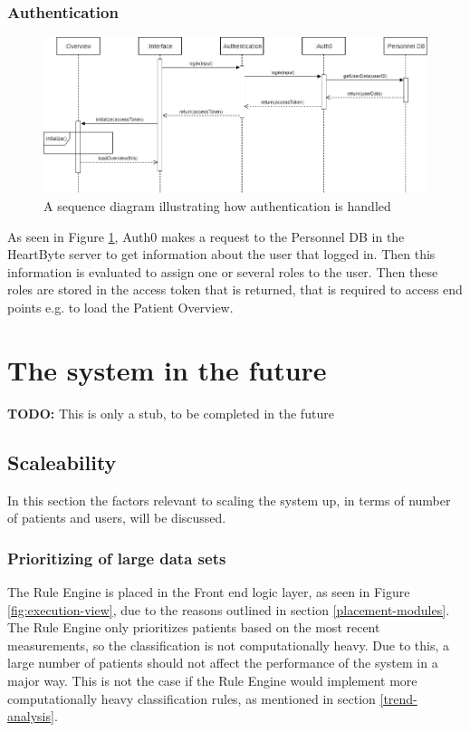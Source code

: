 \documentclass{article}
\begin{document}
\subsubsection{Authentication}
\begin{figure}[h]
    \centering
    \includegraphics[scale = 0.45]{auth-sequence}
    \caption{A sequence diagram illustrating how authentication is handled}
    \label{fig:auth-sequence}
\end{figure}

As seen in Figure \ref{fig:auth-sequence}, Auth0 makes a request to the Personnel DB in the HeartByte server to get information about the user that logged in. Then this information is evaluated to assign one or several roles to the user. Then these roles are stored in the access token that is returned, that is required to access end points e.g. to load the Patient Overview.

\clearpage
\section{The system in the future}
\textbf{TODO:} 
This is only a stub, to be completed in the future

\subsection{Scaleability}
In this section the factors relevant to scaling the system up, in terms of number of patients and users, will be discussed.

\subsubsection{Prioritizing of large data sets}
The Rule Engine is placed in the Front end logic layer, as seen in Figure \ref{fig:execution-view}, due to the reasons outlined in section \ref{placement-modules}. The Rule Engine only prioritizes patients based on the most recent measurements, so the classification is not computationally heavy. Due to this, a large number of patients should not affect the performance of the system in a major way. This is not the case if the Rule Engine would implement more computationally heavy classification rules, as mentioned in section \ref{trend-analysis}.
\end{document}
